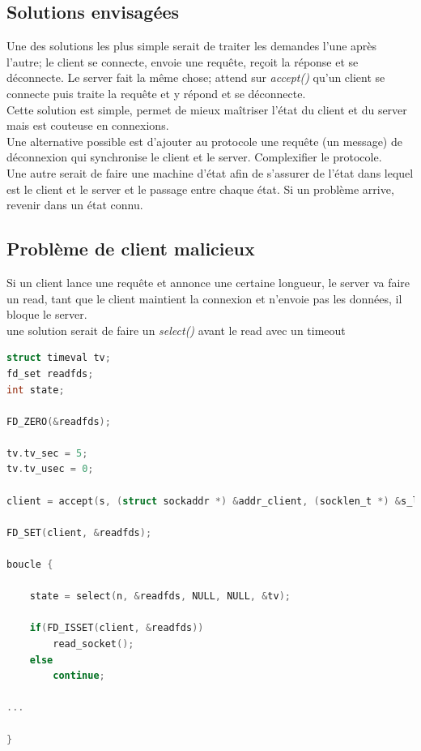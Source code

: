 \documentclass[a4paper,12pt]{article}
\begin{document}
\subsection*{Solutions envisagées}

Une des solutions les plus simple serait de traiter les demandes l'une après l'autre; le client se connecte, envoie une requête, reçoit la réponse et se déconnecte. Le server fait la même chose; attend sur \emph{accept()} qu'un client se connecte puis traite la requête et y répond et se déconnecte.\\

Cette solution est simple, permet de mieux maîtriser l'état du client et du server mais est couteuse en connexions.\\


Une alternative possible est d'ajouter au protocole une requête (un message) de déconnexion qui synchronise le client et le server. Complexifier le protocole.\\

Une autre serait de faire une machine d'état afin de s'assurer de l'état dans lequel est le client et le server et le passage entre chaque état. Si un problème arrive, revenir dans un état connu.

\subsection*{Problème de client malicieux}

Si un client lance une requête et annonce une certaine longueur, le server va faire un read, tant que le client maintient la connexion et n'envoie pas les données, il bloque le server.\\

une solution serait de faire un \emph{select()} avant le read avec un timeout

\begin{lstlisting}[language=C, caption=pseudo code del\_entry()]
struct timeval tv;
fd_set readfds;
int state;

FD_ZERO(&readfds);

tv.tv_sec = 5;
tv.tv_usec = 0;

client = accept(s, (struct sockaddr *) &addr_client, (socklen_t *) &s_len);

FD_SET(client, &readfds);

boucle {

	state = select(n, &readfds, NULL, NULL, &tv);
	
	if(FD_ISSET(client, &readfds))
		read_socket();
	else
		continue;

...

}
\end{lstlisting}
\end{document}
